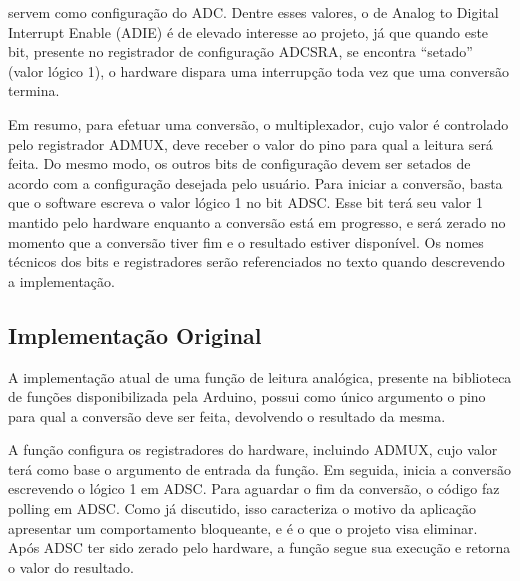 \documentclass{article}
\begin{document}
servem como configuração do ADC. Dentre esses valores, o de Analog to Digital Interrupt
Enable (ADIE) é de elevado interesse ao projeto, já que quando este bit, presente no registrador de
configuração ADCSRA, se encontra “setado” (valor lógico 1), o hardware dispara uma interrupção
toda vez que uma conversão termina.
\par Em resumo, para efetuar uma conversão, o multiplexador, cujo valor é controlado pelo registrador
ADMUX, deve receber o valor do pino para qual a leitura será feita. Do mesmo modo, os outros
bits de configuração devem ser setados de acordo com a configuração desejada pelo usuário. Para
iniciar a conversão, basta que o software escreva o valor lógico 1 no bit ADSC. Esse bit terá seu valor
1 mantido pelo hardware enquanto a conversão está em progresso, e será zerado no momento que a
conversão tiver fim e o resultado estiver disponível. Os nomes técnicos dos bits e registradores serão
referenciados no texto quando descrevendo a implementação.

\subsection{Implementação Original}

\tab A implementação atual de uma função de leitura analógica, presente na biblioteca de funções
disponibilizada pela Arduino, possui como único argumento o pino para qual a conversão deve ser
feita, devolvendo o resultado da mesma.
\par A função configura os registradores do hardware, incluindo ADMUX, cujo valor terá como base o
argumento de entrada da função. Em seguida, inicia a conversão escrevendo o lógico 1 em ADSC.
Para aguardar o fim da conversão, o código faz polling em ADSC. Como já discutido, isso caracteriza
o motivo da aplicação apresentar um comportamento bloqueante, e é o que o projeto visa eliminar.
Após ADSC ter sido zerado pelo hardware, a função segue sua execução e retorna o valor do
resultado.
\end{document}
